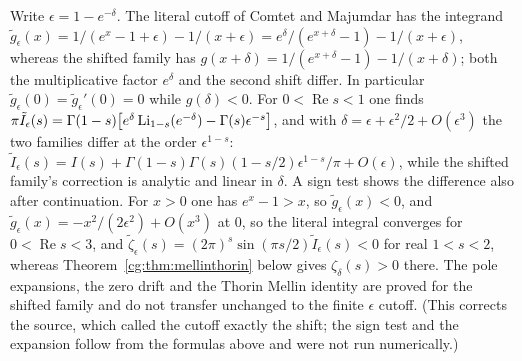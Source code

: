 \begin{remark}\label{cg:rem:literal}
Write $\epsilon=1-e^{-\delta}$. The literal cutoff of Comtet and Majumdar has the integrand $\tilde g_\epsilon(x)=1/(e^x-1+\epsilon)-1/(x+\epsilon)=e^\delta/(e^{x+\delta}-1)-1/(x+\epsilon)$, whereas the shifted family has $g(x+\delta)=1/(e^{x+\delta}-1)-1/(x+\delta)$; both the multiplicative factor $e^\delta$ and the second shift differ. In particular $\tilde g_\epsilon(0)=\tilde g_\epsilon'(0)=0$ while $g(\delta)<0$. For $0<\operatorname{Re}s<1$ one finds $\pi\tilde I_\epsilon(s)=\Gamma(1-s)\bigl[e^\delta\operatorname{Li}_{1-s}(e^{-\delta})-\Gamma(s)\epsilon^{-s}\bigr]$, and with $\delta=\epsilon+\epsilon^2/2+O(\epsilon^3)$ the two families differ at the order $\epsilon^{1-s}$: $\tilde I_\epsilon(s)=I(s)+\Gamma(1-s)\Gamma(s)(1-s/2)\epsilon^{1-s}/\pi+O(\epsilon)$, while the shifted family's correction is analytic and linear in $\delta$. A sign test shows the difference also after continuation. For $x>0$ one has $e^x-1>x$, so $\tilde g_\epsilon(x)<0$, and $\tilde g_\epsilon(x)=-x^2/(2\epsilon^2)+O(x^3)$ at $0$, so the literal integral converges for $0<\operatorname{Re}s<3$, and $\tilde\zeta_\epsilon(s)=(2\pi)^s\sin(\pi s/2)\tilde I_\epsilon(s)<0$ for real $1<s<2$, whereas Theorem~\ref{cg:thm:mellinthorin} below gives $\zeta_\delta(s)>0$ there. The pole expansions, the zero drift and the Thorin Mellin identity are proved for the shifted family and do not transfer unchanged to the finite $\epsilon$ cutoff. (This corrects the source, which called the cutoff exactly the shift; the sign test and the expansion follow from the formulas above and were not run numerically.)
\end{remark}
